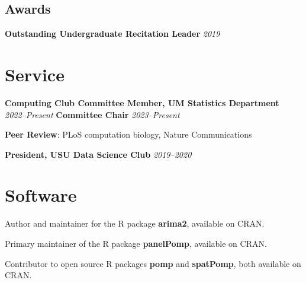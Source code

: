 \documentclass[11pt] {article}
\begin{document}
\subsection*{Awards}

\hspace{5mm}\textbf{Outstanding Undergraduate Recitation Leader} \hfill  {\textit{2019}}

\noindent\hspace{5mm}{\it USU Mathematics and Statistics Department}

\section*{Service}

\noindent \textbf{Computing Club Committee Member, UM Statistics Department} \hfill  {\textit{2022--Present}}
\noindent \textbf{Committee Chair} \hfill {\it 2023--Present}

\vspace{2mm}
\noindent \textbf{Peer Review}: PLoS computation biology, Nature Communications

\vspace{2mm}
\noindent \textbf{President, USU Data Science Club} \hfill  {\textit{2019--2020}}

\section*{Software}

\noindent Author and maintainer for the R package \textbf{arima2}, available on CRAN.

\vspace{2mm}
\noindent Primary maintainer of the R package \textbf{panelPomp}, available on CRAN.

\vspace{2mm}
\noindent Contributor to open source R packages \textbf{pomp} and \textbf{spatPomp}, both available on CRAN.
\end{document}
